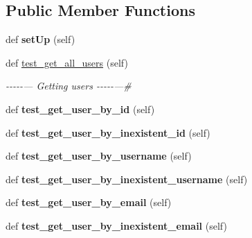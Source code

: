 \subsection*{Public Member Functions}
\begin{DoxyCompactItemize}
\item 
\mbox{\label{classtests_1_1test__3__get__users__route_1_1_test_user_routes_af3e4f4a1ae18dc41f41faede19413528}} 
def {\bfseries set\+Up} (self)
\item 
\mbox{\label{classtests_1_1test__3__get__users__route_1_1_test_user_routes_ab357a55764ed91b7939a1a8e843037b7}} 
def \hyperlink{classtests_1_1test__3__get__users__route_1_1_test_user_routes_ab357a55764ed91b7939a1a8e843037b7}{test\+\_\+get\+\_\+all\+\_\+users} (self)
\begin{DoxyCompactList}\small\item\em -\/-\/-\/-\/-\/--- Getting users -\/-\/-\/-\/-\/---\# \end{DoxyCompactList}\item 
\mbox{\label{classtests_1_1test__3__get__users__route_1_1_test_user_routes_a2bc473f36cf31b336266ccdb4f37c627}} 
def {\bfseries test\+\_\+get\+\_\+user\+\_\+by\+\_\+id} (self)
\item 
\mbox{\label{classtests_1_1test__3__get__users__route_1_1_test_user_routes_ad6191f4caf3ef7277b113e456da05a4b}} 
def {\bfseries test\+\_\+get\+\_\+user\+\_\+by\+\_\+inexistent\+\_\+id} (self)
\item 
\mbox{\label{classtests_1_1test__3__get__users__route_1_1_test_user_routes_a19bcfa455d8eb21c7f83d386561cd070}} 
def {\bfseries test\+\_\+get\+\_\+user\+\_\+by\+\_\+username} (self)
\item 
\mbox{\label{classtests_1_1test__3__get__users__route_1_1_test_user_routes_ace46c4b752d4638207a6ad0dae3314c4}} 
def {\bfseries test\+\_\+get\+\_\+user\+\_\+by\+\_\+inexistent\+\_\+username} (self)
\item 
\mbox{\label{classtests_1_1test__3__get__users__route_1_1_test_user_routes_ae03d3459b66c349f0ccbd5a9793196f4}} 
def {\bfseries test\+\_\+get\+\_\+user\+\_\+by\+\_\+email} (self)
\item 
\mbox{\label{classtests_1_1test__3__get__users__route_1_1_test_user_routes_a392a74672ae9272531dea2e216fff1ca}} 
def {\bfseries test\+\_\+get\+\_\+user\+\_\+by\+\_\+inexistent\+\_\+email} (self)
\end{DoxyCompactItemize}
